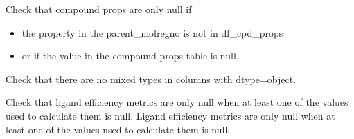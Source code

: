 \documentclass[letterpaper,10pt,english]{sphinxmanual}
\begin{document}

\begin{fulllineitems}
\label{\detokenize{sanity_checks:sanity_checks.check_compound_props}}
\pysigstartsignatures
{}
\pysigstopsignatures
\sphinxAtStartPar
Check that compound props are only null if
\begin{itemize}
\item {} 
\sphinxAtStartPar
the property in the parent\_molregno is not in df\_cpd\_props

\item {} 
\sphinxAtStartPar
or if the value in the compound props table is null.

\end{itemize}

\end{fulllineitems}


\begin{fulllineitems}
\label{\detokenize{sanity_checks:sanity_checks.check_for_mixed_types}}
\pysigstartsignatures
{}
\pysigstopsignatures
\sphinxAtStartPar
Check that there are no mixed types in columns with dtype=object.

\end{fulllineitems}


\begin{fulllineitems}
\label{\detokenize{sanity_checks:sanity_checks.check_ligand_efficiency_metrics}}
\pysigstartsignatures
{}
\pysigstopsignatures
\sphinxAtStartPar
Check that ligand efficiency metrics are only null
when at least one of the values used to calculate them is null.
Ligand efficiency metrics are only null when at least
one of the values used to calculate them is null.

\end{fulllineitems}
\end{document}
